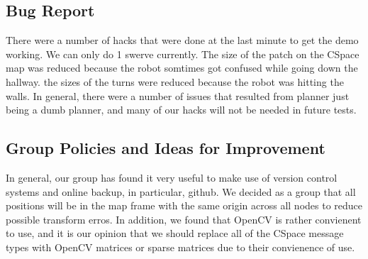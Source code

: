 \documentclass{article}
\begin{document}
\subsection{Bug Report}

There were a number of hacks that were done at the last minute to get the demo working.  We can only do 1 swerve currently. 
The size of the patch on the CSpace map was reduced because the robot somtimes got confused while going down the hallway.
the sizes of the turns were reduced because the robot was hitting the walls.
In general, there were a number of issues that resulted from planner just being a dumb planner, and many of our hacks will not be needed in future tests.

\subsection{Group Policies and Ideas for Improvement}

In general, our group has found it very useful to make use of version control systems and online backup, in particular, github.
We decided as a group that all positions will be in the map frame with the same origin across all nodes to reduce possible transform erros.
In addition, we found that OpenCV is rather convienent to use, and it is our opinion that we should replace all of the CSpace message types with OpenCV matrices or sparse matrices due to their convienence of use.
\end{document}
